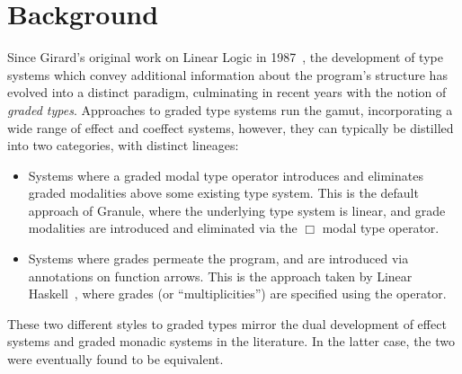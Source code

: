 \chapter{Background}
\label{chapter:background}
Since Girard's original work on Linear Logic in 1987~\cite{girard1987linear}, the development of type
systems which convey additional information about the program's structure has
evolved into a distinct paradigm, culminating in recent years with the notion of
\textit{graded types}. Approaches to graded type systems run the gamut,
incorporating a wide range of effect and coeffect systems, however, they 
can typically be distilled into two categories, with distinct lineages: 
\begin{itemize}
  \item Systems where a graded modal type operator introduces and eliminates
        graded modalities above some existing type system. This is the default
        approach of Granule, where the underlying type system is linear,
        and grade modalities are introduced and eliminated via the $\Box$ modal
        type operator.
  \item Systems where grades permeate the program, and are introduced via annotations 
        on function arrows. This is the approach taken by Linear Haskell~\cite{DBLP:journals/pacmpl/BernardyBNJS18}, where 
        grades (or ``multiplicities'') are specified using the \granin{\%} operator. 
\end{itemize}  
These two different styles to graded types mirror the dual development of 
effect systems and graded monadic systems in the literature. In the latter case, 
the two were eventually found to be equivalent. 







